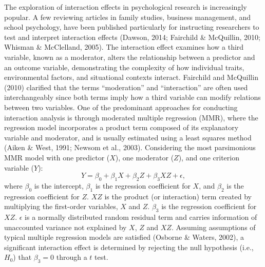 \documentclass[
  11pt,
  man]{apa6}
\begin{document}
The exploration of interaction effects in psychological research is increasingly popular. A few reviewing articles in family studies, business management, and school psychology, have been published particularly for instructing researchers to test and interpret interaction effects (Dawson, 2014; Fairchild \& McQuillin, 2010; Whisman \& McClelland, 2005). The interaction effect examines how a third variable, known as a moderator, alters the relationship between a predictor and an outcome variable, demonstrating the complexity of how individual traits, environmental factors, and situational contexts interact. Fairchild and McQuillin (2010) clarified that the terms ``moderation'' and ``interaction'' are often used interchangeably since both terms imply how a third variable can modify relations between two variables. One of the predominant approaches for conducting interaction analysis is through moderated multiple regression (MMR), where the regression model incorporates a product term composed of its explanatory variable and moderator, and is usually estimated using a least squares method (Aiken \& West, 1991; Newsom et al., 2003). Considering the most parsimonious MMR model with one predictor (\(X\)), one moderator (\(Z\)), and one criterion variable (\(Y\)):
\begin{equation}
Y = \beta_{0} + \beta_{1}X + \beta_{2}Z + \beta_{3}XZ + \epsilon,
\end{equation}
where \(\beta_{0}\) is the intercept, \(\beta_{1}\) is the regression coefficient for \(X\), and \(\beta_{2}\) is the regression coefficient for \(Z\). \(XZ\) is the product (or interaction) term created by multiplying the first-order variables, \(X\) and \(Z\). \(\beta_{3}\) is the regression coefficient for \(XZ\). \(\epsilon\) is a normally distributed random residual term and carries information of unaccounted variance not explained by \(X\), \(Z\) and \(XZ\). Assuming assumptions of typical multiple regression models are satisfied (Osborne \& Waters, 2002), a significant interaction effect is determined by rejecting the null hypothesis (i.e., \(H_{0}\)) that \(\beta_{3} = 0\) through a \(t\) test.
\end{document}
